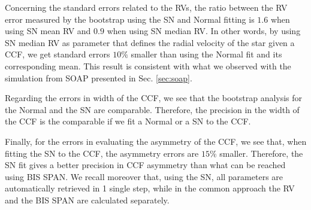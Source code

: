 \documentclass{aa}
\begin{document}
Concerning the standard errors related to the RVs, the ratio between the RV error measured by the bootstrap using the SN and Normal fitting is $1.6$ when using SN mean RV and $0.9$ when using SN median RV. In other words, by using SN median RV as parameter that defines the radial velocity of the star given a CCF, we get standard errors $10\%$ smaller than using the Normal fit and its corresponding mean. This result is consistent with what we observed with the simulation from SOAP presented in Sec. \ref{sec:soap}.

Regarding the errors in width of the CCF, we see that the bootstrap analysis for the Normal and the SN are comparable. Therefore, the precision in the width of the CCF is the comparable if we fit a Normal or a SN to the CCF.

Finally, for the errors in evaluating the asymmetry of the CCF, we see that, when fitting the SN to the CCF, the asymmetry errors are $15\%$ smaller. Therefore, the SN fit gives a better precision in CCF asymmetry than what can be reached using BIS SPAN. We recall moreover that, using the SN, all parameters are automatically retrieved in 1 single step, while in the common approach the RV and the BIS SPAN are calculated separately.
\end{document}
